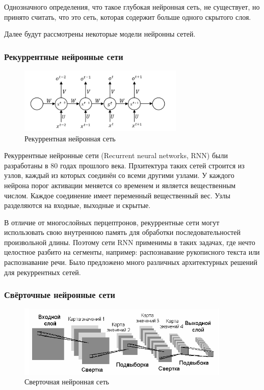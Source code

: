 Однозначного определения, что такое глубокая нейронная сеть, не существует, но принято считать, что это сеть, которая содержит больше одного скрытого слоя.

Далее будут рассмотрены некоторые модели нейронны сетей.

\subsubsection{Рекуррентные нейронные сети }
\begin{figure}[htbp]
\centering
\caption{Рекуррентная нейронная сеть }
\includegraphics[width=0.7\textwidth]{fig/hzZ4m.png}
\end{figure}

Рекуррентные нейронные сети (Recurrent neural networks, RNN) были разработаны в 80 годах прошлого века. Прхитектура таких сетей строится из узлов, каждый из которых соединён со всеми другими узлами. У каждого нейрона порог активации меняется со временем и является вещественным числом. Каждое соединение имеет переменный вещественный вес. Узлы разделяются на входные, выходные и скрытые. 

В отличие от многослойных перцептронов, рекуррентные сети могут использовать свою внутреннюю память для обработки последовательностей произвольной длины. Поэтому сети RNN применимы в таких задачах, где нечто целостное разбито на сегменты, например: распознавание рукописного текста или распознавание речи. Было предложено много различных архитектурных решений для рекуррентных сетей.



\subsubsection{Свёрточные нейронные сети}

\begin{figure}[htbp]
\centering
\caption{Сверточная нейронная сеть}

\includegraphics[width=0.9\textwidth]{fig/cnn}
\end{figure}

